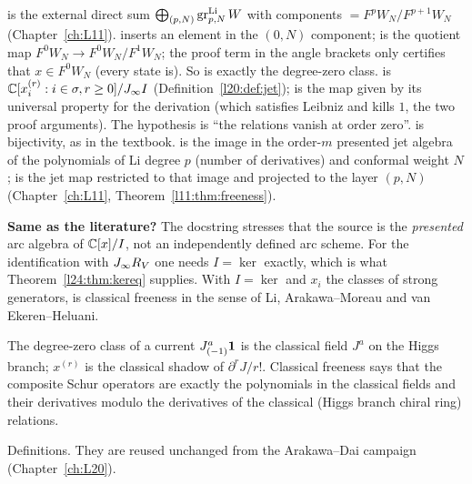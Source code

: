\begin{dictionary}
 is the external direct sum $\bigoplus_{(p,N)}\operatorname{gr}^{\mathrm{Li}}_{p,N}W$ with
components $=F^pW_N/F^{p+1}W_N$ (Chapter~\ref{ch:L11}). 
inserts an element in the $(0,N)$ component;  is the quotient map $F^0W_N\to F^0W_N/F^1W_N$; the
proof term in the angle brackets only certifies that $x\in F^0W_N$ (every state is). So
 is exactly the degree-zero class.
 is ${\mathbb{C}}[x_i^{(r)}:i\in\sigma,r\ge0]/J_\infty I$ (Definition~\ref{l20:def:jet});
 is the map given by its universal property for the derivation
 (which satisfies Leibniz and kills $1$, the two proof arguments).
The hypothesis  is ``the relations vanish at order zero''.  is
bijectivity, as in the textbook.  is the image in the
order-$m$ presented jet algebra of the polynomials of Li degree $p$ (number of derivatives) and conformal
weight $N$;  is the jet map restricted to that image and projected to the
layer $(p,N)$ (Chapter~\ref{ch:L11}, Theorem~\ref{l11:thm:freeness}).

\textbf{Same as the literature?} The docstring stresses that the source is the \emph{presented} arc
algebra of ${\mathbb{C}}[x]/I$, not an independently defined arc scheme. For the identification with
$J_\infty R_V$ one needs $I=\ker$ exactly, which is what Theorem~\ref{l24:thm:kereq} supplies. With
$I=\ker$ and $x_i$ the classes of strong generators,  is classical
freeness in the sense of Li, Arakawa--Moreau and van Ekeren--Heluani.
\end{dictionary}

\begin{physics}
The degree-zero class of a current $J^a_{(-1)}\mathbf 1$ is the classical field $J^a$ on the Higgs
branch; $x^{(r)}$ is the classical shadow of $\partial^rJ/r!$. Classical freeness says that the composite
Schur operators are exactly the polynomials in the classical fields and their derivatives modulo the
derivatives of the classical (Higgs branch chiral ring) relations.
\end{physics}

\begin{status}
Definitions. They are reused unchanged from the Arakawa--Dai campaign (Chapter~\ref{ch:L20}).
\end{status}

